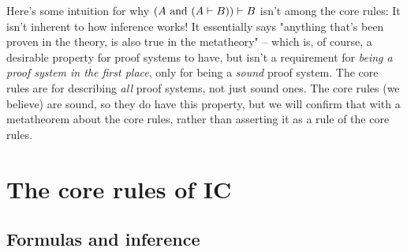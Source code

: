 \documentclass{article}
\begin{document}
  Here's some intuition for why $(A\ \mathrm{and}\ (A \vdash B)) \vdash B$ isn't among the core rules: It isn't inherent to how inference works! It essentially says "anything that's been proven in the theory, is also true in the metatheory" – which is, of course, a desirable property for proof systems to have, but isn't a requirement for \emph{being a proof system in the first place}, only for being a \emph{sound} proof system. The core rules are for describing \emph{all} proof systems, not just sound ones. The core rules (we believe) are sound, so they do have this property, but we will confirm that with a metatheorem about the core rules, rather than asserting it as a rule of the core rules.
  
  \section{The core rules of IC}
 
  \subsection{Formulas and inference}
  
  \newcommand{\id}{\name{id}}
  \newcommand{\const}{\name{const}}
  \newcommand{\default}{\name{default}}
  \newcommand{\fuse}{\name{fuse}}
  
  \newcommand{\atomemptyset}{\name{empty\_set}}
  \newcommand{\atomsingleton}{\name{singleton}}
  \newcommand{\atomin}{\name{in}}
  \newcommand{\atomunion}{\name{union}}
  \newcommand{\atomconcludes}{\name{concludes}}
  \newcommand{\atomall}{\name{all}}
  \newcommand{\atominfrule}{\name{rule}}
  \newcommand{\atomimplies}{\name{implies}}
  \renewcommand{\emptyset}{\varnothing}
  \newcommand{\singleton}[1]{\{#1\}}
  \newcommand{\union}{\cup}
  
  \newcommand{\and}{\wedge}
  \newcommand{\all}{\bigcup}
  \newcommand{\atomequals}{\name{equals}}
  \newcommand{\equals}{\equiv}
  \newcommand{\concludes}{\leadsto}
  \newcommand{\infrule}{\vdash}
  
  
\end{document}
